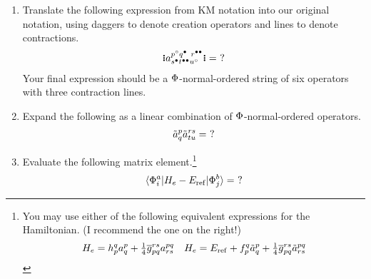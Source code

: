 \documentclass[11pt]{article}
\numberwithin{equation}{section}
\begin{document}
\begin{enumerate}
\item
  Translate the following expression from KM notation into our original notation, using daggers to denote creation operators and lines to denote contractions.
\begin{align*}
  \gno{
    a^{p^\hole q^{\ptcl\phantom{\ptcl}} r^{\ptcl\ptcl}}
     _{s^\ptcl t^{\ptcl\ptcl} u^\hole}
  }
=
  \,\,?
\end{align*}
  Your final expression should be a $\Phi $-normal-ordered string of six operators with three contraction lines.

\newpage
\item
Expand the following as a linear combination of $\Phi $-normal-ordered operators.
\begin{align*}
  \tilde{a}^p_q
  \tilde{a}^{rs}_{tu}
=
  \,\,?
\end{align*}


\newpage
\item
Evaluate the following matrix element.\footnote{You may use either of the following equivalent expressions for the Hamiltonian. (I recommend the one on the right!)
\begin{align*}
  H_e
=
  h_p^q
  a^p_q
+
  \tfrac{1}{4}
  \overline{g}_{pq}^{rs}
  a^{pq}_{rs}
&&
  H_e
=
  E_{\mathrm{ref}}
+
  f_p^q
  \tilde{a}^p_q
+
  \tfrac{1}{4}
  \overline{g}_{pq}^{rs}
  \tilde{a}^{pq}_{rs}
\end{align*}
}
\begin{align*}
  \langle\Phi _i^a|H_e - E_{\mathrm{ref}}|\Phi _j^b\rangle
=
  \,\,?
\end{align*}
\end{enumerate}
\end{document}
